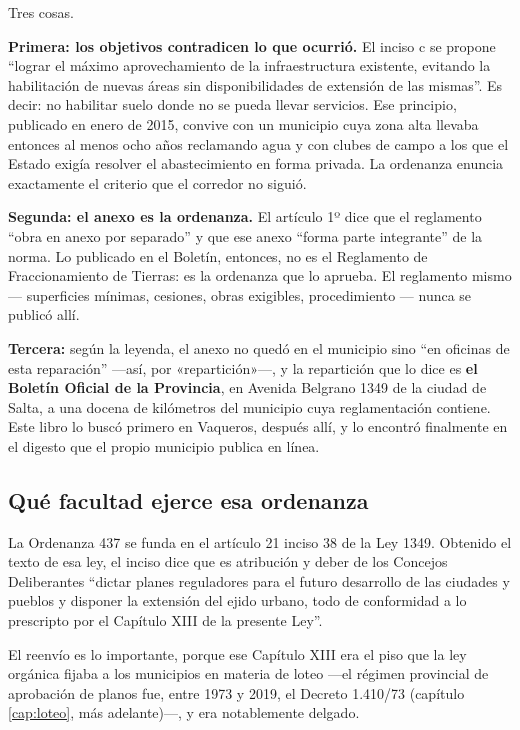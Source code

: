 Tres cosas.

\textbf{Primera: los objetivos contradicen lo que ocurrió.} El inciso c se propone ``lograr el máximo aprovechamiento de la infraestructura existente, evitando la habilitación de nuevas áreas sin disponibilidades de extensión de las mismas''. Es decir: no habilitar suelo donde no se pueda llevar servicios. Ese principio, publicado en enero de 2015, convive con un municipio cuya zona alta llevaba entonces al menos ocho años reclamando agua y con clubes de campo a los que el Estado exigía resolver el abastecimiento en forma privada. La ordenanza enuncia exactamente el criterio que el corredor no siguió.

\textbf{Segunda: el anexo es la ordenanza.} El artículo 1º dice que el reglamento ``obra en anexo por separado'' y que ese anexo ``forma parte integrante'' de la norma. Lo publicado en el Boletín, entonces, no es el Reglamento de Fraccionamiento de Tierras: es la ordenanza que lo aprueba. El reglamento mismo --- superficies mínimas, cesiones, obras exigibles, procedimiento --- nunca se publicó allí.

\textbf{Tercera:} según la leyenda, el anexo no quedó en el municipio sino ``en oficinas de esta reparación'' ---así, por «repartición»---, y la repartición que lo dice es \textbf{el Boletín Oficial de la Provincia}, en Avenida Belgrano 1349 de la ciudad de Salta, a una docena de kilómetros del municipio cuya reglamentación contiene. Este libro lo buscó primero en Vaqueros, después allí, y lo encontró finalmente en el digesto que el propio municipio publica en línea.

\subsection*{Qué facultad ejerce esa ordenanza}

La Ordenanza 437 se funda en el artículo 21 inciso 38 de la Ley 1349. Obtenido el texto de esa ley, el inciso dice que es atribución y deber de los Concejos Deliberantes ``dictar planes reguladores para el futuro desarrollo de las ciudades y pueblos y disponer la extensión del ejido urbano, todo de conformidad a lo prescripto por el Capítulo XIII de la presente Ley''.

El reenvío es lo importante, porque ese Capítulo XIII era el piso que la ley orgánica fijaba a los municipios en materia de loteo ---el régimen provincial de aprobación de planos fue, entre 1973 y 2019, el Decreto 1.410/73 (capítulo \ref{cap:loteo}, más adelante)---, y era notablemente delgado.

